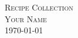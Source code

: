 \documentclass[onecolumn,a4paper,fleqn,12pt]{scrreprt}
\begin{document}
\newcommand{\HRule}{\rule{\linewidth}{0.5mm}}

\begin{titlepage}
\begin{center}

\textsc{\Large Recipe Collection}\\[0.2cm] 
\textsc{Your Name}\\[0.2cm] 
{\large \today}


\end{center}
\end{titlepage}

\setcounter{tocdepth}{1}
\tableofcontents
\end{document}
